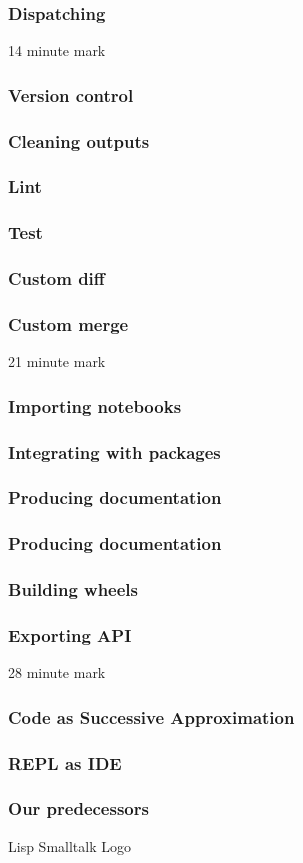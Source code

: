 \begin{frame}
\frametitle{Dispatching}
\end{frame}

14 minute mark

\begin{frame}
\frametitle{Version control}
\end{frame}

\begin{frame}
\frametitle{Cleaning outputs}
\end{frame}

\begin{frame}
\frametitle{Lint}
\end{frame}

\begin{frame}
\frametitle{Test}
\end{frame}

\begin{frame}
\frametitle{Custom diff}
\end{frame}

\begin{frame}
\frametitle{Custom merge}
\end{frame}

21 minute mark

\begin{frame}
\frametitle{Importing notebooks}
\end{frame}

\begin{frame}
\frametitle{Integrating with packages}
\end{frame}

\begin{frame}
\frametitle{Producing documentation}
\end{frame}

\begin{frame}
\frametitle{Producing documentation}
\end{frame}

\begin{frame}
\frametitle{Building wheels}
\end{frame}

\begin{frame}
\frametitle{Exporting API}
\end{frame}

28 minute mark

\begin{frame}
\frametitle{Code as Successive Approximation}
\end{frame}

\begin{frame}
\frametitle{REPL as IDE}
\end{frame}

\begin{frame}
\frametitle{Our predecessors}
Lisp
Smalltalk
Logo
\end{frame}


